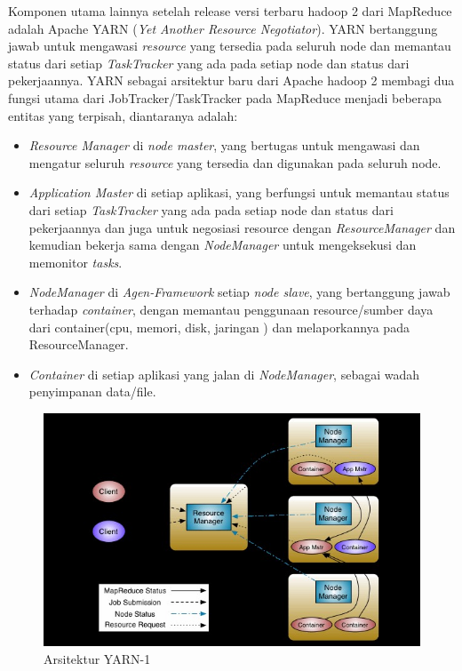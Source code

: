 		Komponen utama lainnya setelah release versi terbaru hadoop 2 dari MapReduce adalah Apache YARN (\textit{Yet Another Resource Negotiator}). YARN bertanggung jawab untuk mengawasi \textit{resource} yang tersedia pada seluruh node dan memantau status dari setiap \textit{TaskTracker} yang ada pada setiap node dan status dari pekerjaannya. YARN sebagai arsitektur baru dari Apache hadoop 2 membagi dua fungsi utama dari JobTracker/TaskTracker pada MapReduce menjadi beberapa entitas yang terpisah, diantaranya adalah: 
		\begin{itemize}
			\item \textit{Resource Manager} di \textit{node master}, yang bertugas untuk mengawasi dan mengatur seluruh \textit{resource} yang tersedia dan digunakan pada seluruh node.
			\item \textit{Application Master} di setiap aplikasi, yang berfungsi untuk memantau status dari setiap \textit{TaskTracker} yang ada pada setiap node dan status dari pekerjaannya dan juga untuk negosiasi resource dengan \textit{ResourceManager} dan kemudian bekerja sama dengan \textit{NodeManager} untuk mengeksekusi dan memonitor \textit{tasks}.
			\item \textit{NodeManager} di \textit{Agen-Framework} setiap \textit{node slave}, yang bertanggung jawab terhadap \textit{container}, dengan memantau penggunaan resource/sumber daya dari container(cpu, memori, disk, jaringan ) dan melaporkannya pada ResourceManager.
			\item \textit{Container} di setiap aplikasi yang jalan di \textit{NodeManager}, sebagai wadah penyimpanan data/file.
		\end{itemize}
		
\begin{figure}[H]
\centering
\includegraphics[scale=0.43]{Gambar/YARN-Architecture}
\caption[Arsitektur YARN-1]{Arsitektur YARN-1}
\label{fig:Arsitektur YARN-1}
\end{figure}
		
